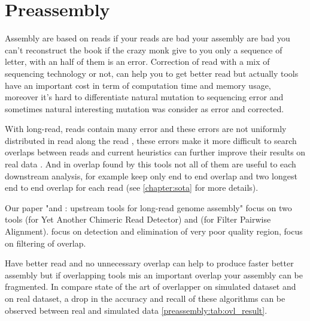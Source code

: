 \documentclass[main.tex]{subfiles}
\begin{document}
\chapter{Preassembly}\label{chapter:preassembly}

Assembly are based on reads if your reads are bad your assembly are bad you can't reconstruct the book if the crazy monk give to you only a sequence of letter, with an half of them is an error. Correction of read with a mix of sequencing technology or not, can help you to get better read but actually tools have an important cost in term of computation time and memory usage, moreover it's hard to differentiate natural mutation to sequencing error and sometimes natural interesting mutation was consider as error and corrected.

With long-read, reads contain many error and these errors are not uniformly distributed in read along the read \cite{blog_post_error_repartition}, these errors make it more difficult to search overlaps between reads and current heuristics can further improve their results on real data \cite{ovl_bench}.
And in overlap found by this tools not all of them are useful to each downstream analysis, for example \miniasm keep only end to end overlap and \canu two longest end to end overlap for each read (see \ref{chapter:sota} for more details).

Our paper "\yacrd and \fpa: upstream tools for long-read genome assembly" focus on two tools \yacrd (for Yet Another Chimeric Read Detector) and \fpa (for Filter Pairwise Alignment). \yacrd focus on detection and elimination of very poor quality region, \fpa focus on filtering of overlap.

Have better read and no unnecessary overlap can help to produce faster better assembly but if overlapping tools mis an important overlap your assembly can be fragmented.
In \cite{ovl_bench} \citeauthor{ovl_bench} compare state of the art of overlapper on simulated dataset and on real dataset, a drop in the accuracy and recall of these algorithms can be observed between real and simulated data \ref{preassembly:tab:ovl_result}.
\end{document}

